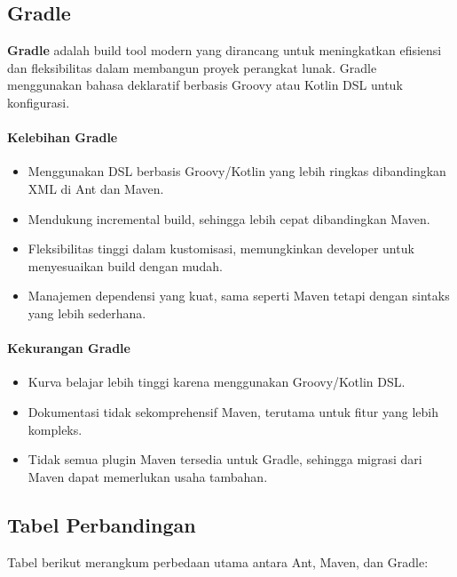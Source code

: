 \subsection{Gradle}
\textbf{Gradle} adalah build tool modern yang dirancang untuk meningkatkan efisiensi dan fleksibilitas dalam membangun proyek perangkat lunak. Gradle menggunakan bahasa deklaratif berbasis Groovy atau Kotlin DSL untuk konfigurasi.

\paragraph{Kelebihan Gradle}
\begin{itemize}
	\item Menggunakan DSL berbasis Groovy/Kotlin yang lebih ringkas dibandingkan XML di Ant dan Maven.
	\item Mendukung incremental build, sehingga lebih cepat dibandingkan Maven.
	\item Fleksibilitas tinggi dalam kustomisasi, memungkinkan developer untuk menyesuaikan build dengan mudah.
	\item Manajemen dependensi yang kuat, sama seperti Maven tetapi dengan sintaks yang lebih sederhana.
\end{itemize}

\paragraph{Kekurangan Gradle}
\begin{itemize}
	\item Kurva belajar lebih tinggi karena menggunakan Groovy/Kotlin DSL.
	\item Dokumentasi tidak sekomprehensif Maven, terutama untuk fitur yang lebih kompleks.
	\item Tidak semua plugin Maven tersedia untuk Gradle, sehingga migrasi dari Maven dapat memerlukan usaha tambahan.
\end{itemize}

\subsection{Tabel Perbandingan}
Tabel berikut merangkum perbedaan utama antara Ant, Maven, dan Gradle:

